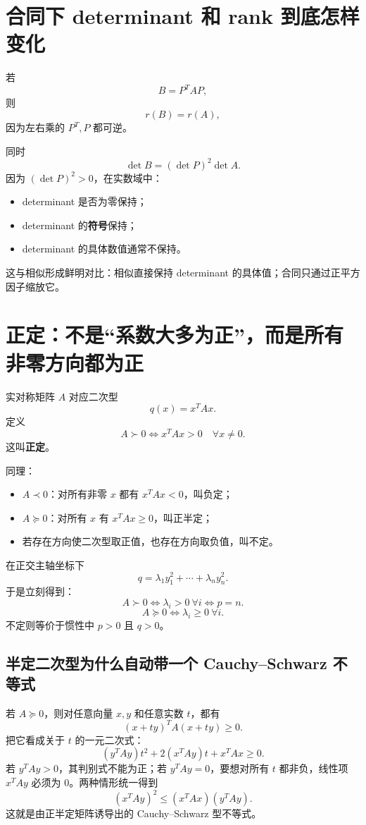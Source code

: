 \documentclass[11pt,a4paper]{ctexart}
\newcommand{\kw}[1]{\textbf{\color{deep}#1}}
\begin{document}
\section{合同下 determinant 和 rank 到底怎样变化}

若
\[
B=P^TAP,
\]
则
\[
r(B)=r(A),
\]
因为左右乘的 $P^T,P$ 都可逆。

同时
\[
\boxed{\det B=(\det P)^2\det A.}
\]
因为 $(\det P)^2>0$，在实数域中：
\begin{itemize}
  \item determinant 是否为零保持；
  \item determinant 的\kw{符号}保持；
  \item determinant 的具体数值通常不保持。
\end{itemize}

这与相似形成鲜明对比：相似直接保持 determinant 的具体值；合同只通过正平方因子缩放它。

\section{正定：不是“系数大多为正”，而是所有非零方向都为正}

实对称矩阵 $A$ 对应二次型
\[
q(x)=x^TAx.
\]
定义
\[
\boxed{A\succ0
\iff x^TAx>0\quad\forall x\neq0.}
\]
这叫\kw{正定}。

同理：
\begin{itemize}
  \item $A\prec0$：对所有非零 $x$ 都有 $x^TAx<0$，叫负定；
  \item $A\succeq0$：对所有 $x$ 有 $x^TAx\ge0$，叫正半定；
  \item 若存在方向使二次型取正值，也存在方向取负值，叫不定。
\end{itemize}

在正交主轴坐标下
\[
q=\lambda_1y_1^2+\cdots+\lambda_ny_n^2.
\]
于是立刻得到：
\[
\boxed{A\succ0\iff \lambda_i>0\ \forall i\iff p=n.}
\]
\[
\boxed{A\succeq0\iff \lambda_i\ge0\ \forall i.}
\]
不定则等价于惯性中 $p>0$ 且 $q>0$。

\subsection{半定二次型为什么自动带一个 Cauchy--Schwarz 不等式}

若 $A\succeq0$，则对任意向量 $x,y$ 和任意实数 $t$，都有
\[
(x+ty)^TA(x+ty)\ge0.
\]
把它看成关于 $t$ 的一元二次式：
\[
(y^TAy)t^2+2(x^TAy)t+x^TAx\ge0.
\]
若 $y^TAy>0$，其判别式不能为正；若 $y^TAy=0$，要想对所有 $t$ 都非负，线性项 $x^TAy$ 必须为 $0$。两种情形统一得到
\[
\boxed{
(x^TAy)^2\le (x^TAx)(y^TAy).
}
\]
这就是由正半定矩阵诱导出的 Cauchy--Schwarz 型不等式。
\end{document}
